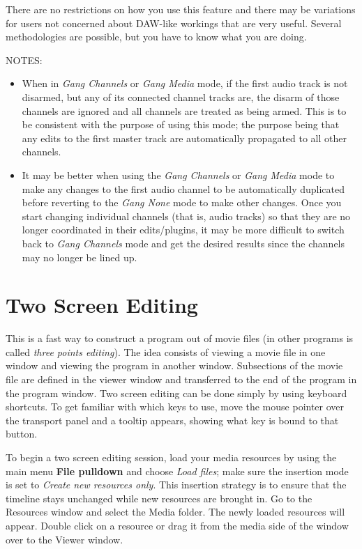 There are no restrictions on how you use this feature and there may be variations for users not concerned about DAW-like workings that are very useful. Several methodologies are possible, but you have to know what you are doing.

NOTES:
\begin{itemize}
	\item When in \textit{Gang Channels} or \textit{Gang Media} mode, if the first audio track is not disarmed, but 	any of its connected channel tracks are, the disarm of those channels are ignored and all channels are treated as being armed. This is to be consistent with the purpose of using this mode; the purpose being that any edits to the first master track are automatically propagated to all other channels.
	\item It may be better when using the \textit{Gang Channels} or \textit{Gang Media} mode to make any changes
	to the first audio channel to be automatically duplicated before reverting to the \textit{Gang None} mode to make other changes. Once you start changing individual channels (that is, audio tracks) so that they are no longer coordinated in their edits/plugins, it may be more difficult to switch back to \textit{Gang Channels} mode and get the desired results since the channels may no longer be lined up.
\end{itemize}

\section{Two Screen Editing}%
\label{sec:two_screen_editing}

This is a fast way to construct a program out of movie files (in
other programs is called \textit{three points editing}). The idea
consists of viewing a movie file in one window and viewing the
program in another window. Subsections of the movie file are defined
in the viewer window and transferred to the end of the program in
the program window.  Two screen editing can be done simply by using
keyboard shortcuts.  To get familiar with which keys to use, move
the mouse pointer over the transport panel and a tooltip appears,
showing what key is bound to that button.

To begin a two screen editing session, load your media resources by
using the main menu \textbf{File pulldown} and choose \textit{Load
  files}; make sure the insertion mode is set to \textit{Create new
  resources only}.  This insertion strategy is to ensure that the
timeline stays unchanged while new resources are brought in. Go to
the Resources window and select the Media folder. The newly loaded
resources will appear. Double click on a resource or drag it from
the media side of the window over to the Viewer window.

